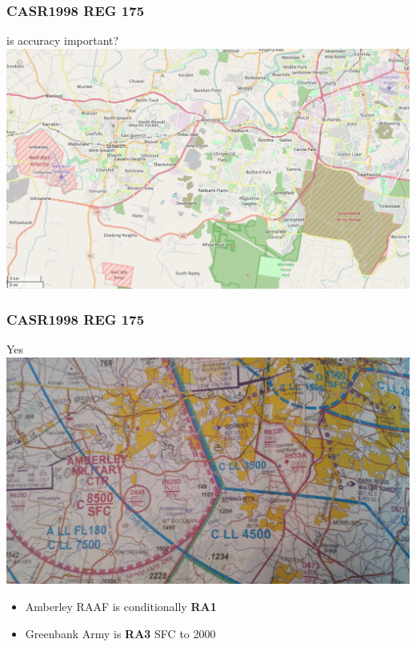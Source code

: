 \begin{frame}
\frametitle{CASR1998 REG 175}
\begin{block}{is accuracy important?}
\includegraphics[height=0.5\textheight]{image/map-amberley-greenbank.png}
\end{block}
\end{frame}

\begin{frame}
\frametitle{CASR1998 REG 175}
\begin{block}{Yes}
\includegraphics[height=0.5\textheight]{image/vtc-amberley-greenbank.jpg}
\begin{itemize}
\item \tiny{Amberley RAAF is conditionally \textbf{RA1}}
\item \tiny{Greenbank Army is \textbf{RA3} SFC to 2000}
\end{itemize}
\end{block}
\end{frame}

